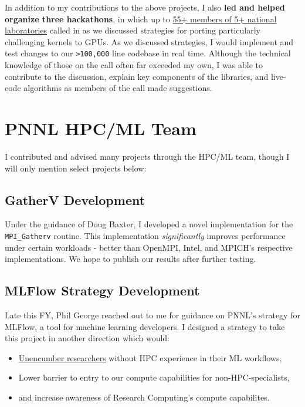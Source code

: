 \documentclass{article}
\begin{document}
\bigskip

In addition to my contributions to the above projects, I also \textbf{led and helped organize three hackathons}, in which up to \underline{55+ members of 5+ national laboratories} called in as we discussed strategies for porting particularly challenging kernels to GPUs.
As we discussed strategies, I would implement and test changes to our \verb|>100,000| line codebase in real time.
Although the technical knowledge of those on the call often far exceeded my own, I was able to contribute to the discussion, explain key components of the libraries, and live-code algorithms as members of the call made suggestions.

\section{PNNL HPC/ML Team}

I contributed and advised many projects through the HPC/ML team, though I will only mention select projects below:

\subsection{GatherV Development}

Under the guidance of Doug Baxter, I developed a novel implementation for the \verb|MPI_Gatherv| routine.
This implementation \textit{significantly} improves performance under certain workloads - better than OpenMPI, Intel, and MPICH's respective implementations.
We hope to publish our results after further testing.

\subsection{MLFlow Strategy Development}

Late this FY, Phil George reached out to me for guidance on PNNL's strategy for MLFlow, a tool for machine learning developers.
I designed a strategy to take this project in another direction which would:

\begin{itemize}
  \item \underline{Unencumber researchers} without HPC experience in their ML workflows,
  \item Lower barrier to entry to our compute capabilities for non-HPC-specialists,
  \item and increase awareness of Research Computing's compute capabilites.
\end{itemize}
\end{document}
